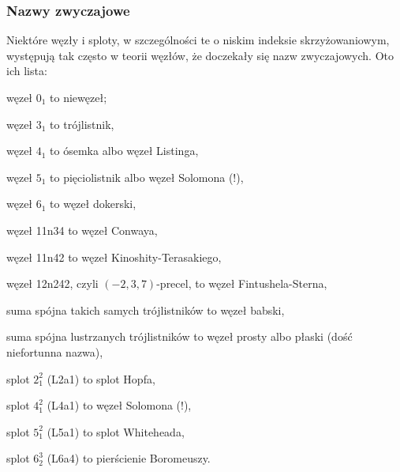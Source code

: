 \subsubsection{Nazwy zwyczajowe}
\label{sssec:link_names}%
Niektóre węzły i sploty, w szczególności te o niskim indeksie skrzyżowaniowym, występują tak często w teorii węzłów, że doczekały się nazw zwyczajowych.
Oto ich lista:
\begin{compactitem}
    \item węzeł $0_1$ to niewęzeł;
    \item węzeł $3_1$ to trójlistnik,
    \item węzeł $4_1$ to ósemka albo węzeł Listinga,
    \item węzeł $5_1$ to pięciolistnik albo węzeł Solomona (!),
    \item węzeł $6_1$ to węzeł dokerski,
    \item węzeł 11n34 to węzeł Conwaya,
    \item węzeł 11n42 to węzeł Kinoshity-Terasakiego,
    \item węzeł 12n242, czyli $(-2, 3, 7)$-precel, to węzeł Fintushela-Sterna,
    \item suma spójna takich samych trójlistników to węzeł babski,
    \item suma spójna lustrzanych trójlistników to węzeł prosty albo płaski (dość niefortunna nazwa),
    \item splot $2_1^2$ (L2a1) to splot Hopfa,
    \item splot $4_1^2$ (L4a1) to węzeł Solomona (!),
    \item splot $5_1^2$ (L5a1) to splot Whiteheada,
    \item splot $6_2^3$ (L6a4) to pierścienie Boromeuszy.
\end{compactitem}

